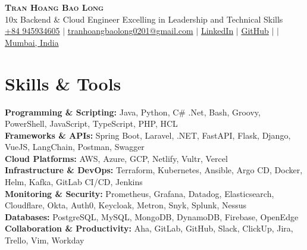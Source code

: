 \documentclass[letterpaper,11pt]{article}
\newcommand{\resumeSubHeadingListStart}{\begin{itemize}[leftmargin=0.15in, label={}]}
\newcommand{\resumeSubHeadingListEnd}{\end{itemize}}
\begin{document}

\begin{center}
  \textbf{\Huge \scshape Tran Hoang Bao Long} \\ \vspace{3pt}
  \normalsize 10x Backend \& Cloud Engineer Excelling in Leadership and Technical Skills \\ \vspace{3pt}
  \small
  \faMobile \hspace{.5pt} \href{tel:0945934605}{+84 945934605}
  $|$
  \faAt \hspace{.5pt} \href{mailto:tranhoangbaolong0201@gmail.com}{tranhoangbaolong0201@gmail.com}
  $|$
  \faLinkedinSquare \hspace{.5pt} \href{https://www.linkedin.com/in/jbhv12/}{LinkedIn}
  $|$
  \faGithub \hspace{.5pt} \href{https://github.com/jbhv12}{GitHub}
  $|$
  $|$
  \faMapMarker \hspace{.5pt} \href{https://goo.gl/maps/Czh1vXePukiKumpu5}{Mumbai, India}
\end{center}


\section{Skills \& Tools}
\vspace{2pt}
\resumeSubHeadingListStart
\small{\item{
              \textbf{Programming \& Scripting:}{ Java, Python, C\# .Net, Bash, Groovy, PowerShell, JavaScript, TypeScript, PHP, HCL} \\ \vspace{3pt}
              \textbf{Frameworks \& APIs:}{ Spring Boot, Laravel, .NET, FastAPI, Flask, Django, VueJS, LangChain, Postman, Swagger} \\ \vspace{3pt}
              \textbf{Cloud Platforms:}{ AWS, Azure, GCP, Netlify, Vultr, Vercel} \\ \vspace{3pt}
              \textbf{Infrastructure \& DevOps:}{ Terraform, Kubernetes, Ansible, Argo CD, Docker, Helm, Kafka, GitLab CI/CD, Jenkins} \\ \vspace{3pt}
              \textbf{Monitoring \& Security:}{ Prometheus, Grafana, Datadog, Elasticsearch, Cloudflare, Okta, Auth0, Keycloak, Metron, Snyk, Splunk, Nessus} \\ \vspace{3pt}
              \textbf{Databases:}{ PostgreSQL, MySQL, MongoDB, DynamoDB, Firebase, OpenEdge} \\ \vspace{3pt}
              \textbf{Collaboration \& Productivity:}{ Aha, GitLab, GitHub, Slack, ClickUp, Jira, Trello, Vim, Workday} \\ \vspace{3pt}
            }}
\resumeSubHeadingListEnd
\end{document}

